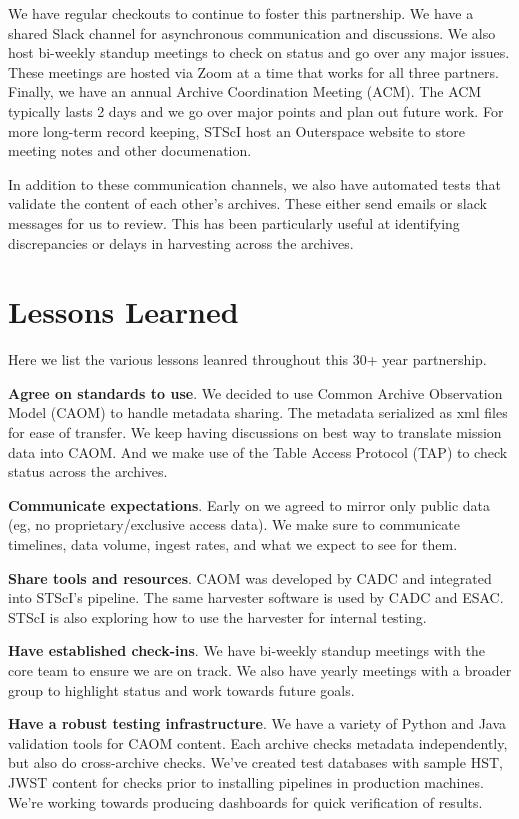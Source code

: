 \documentclass[11pt,twoside]{article}
\begin{document}
We have regular checkouts to continue to foster this partnership. 
We have a shared Slack channel for asynchronous communication and discussions. 
We also host bi-weekly standup meetings to check on status and go over any major issues. 
These meetings are hosted via Zoom at a time that works for all three partners. 
Finally, we have an annual Archive Coordination Meeting (ACM). 
The ACM typically lasts 2 days and we go over major points and plan out future work. 
For more long-term record keeping, STScI host an Outerspace website to store meeting notes and other documenation.

In addition to these communication channels, we also have automated tests that validate the content of each other's archives. 
These either send emails or slack messages for us to review.
This has been particularly useful at identifying discrepancies or delays in harvesting across the archives. 

\section{Lessons Learned}

Here we list the various lessons leanred throughout this 30+ year partnership.

\textbf{Agree on standards to use}. 
We decided to use Common Archive Observation Model (CAOM) to handle metadata sharing. 
The metadata serialized as xml files for ease of transfer. 
We keep having discussions on best way to translate mission data into CAOM. 
And we make use of the Table Access Protocol (TAP) to check status across the archives.

\textbf{Communicate expectations}.
Early on we agreed to mirror only public data (eg, no proprietary/exclusive access data). 
We make sure to communicate timelines, data volume, ingest rates, and what we expect to see for them. 

\textbf{Share tools and resources}. 
CAOM was developed by CADC and integrated into STScI’s pipeline.
The same harvester software is used by CADC and ESAC. 
STScI is also exploring how to use the harvester for internal testing.

\textbf{Have established check-ins}.
We have bi-weekly standup meetings with the core team to ensure we are on track. 
We also have yearly meetings with a broader group to highlight status and work towards future goals.

\textbf{Have a robust testing infrastructure}.
We have a variety of Python and Java validation tools for CAOM content. 
Each archive checks metadata independently, but also do cross-archive checks. 
We've created test databases with sample HST, JWST content for checks prior to installing pipelines in production machines.
We're working towards producing dashboards for quick verification of results.
\end{document}
